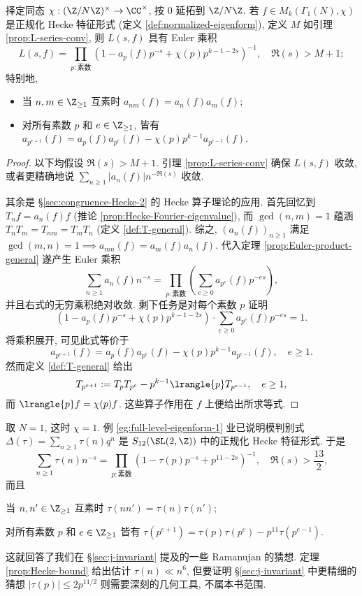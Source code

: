 \begin{theorem}[E.\ Hecke]\label{prop:Euler-prod-eigenform} 
	择定同态 $\chi: (\Z/N\Z)^\times \to \CC^\times$, 按 $0$ 延拓到 $\Z/N\Z$. 若 $f \in M_k(\Gamma_1(N), \chi)$ 是正规化 Hecke 特征形式 (定义 \ref{def:normalized-eigenform}), 定义 $M$ 如引理 \ref{prop:L-series-conv}, 则 $L(s,f)$ 具有 Euler 乘积
	\[ L(s,f) = \prod_{p: \text{素数}} \left( 1 - a_p(f) p^{-s} + \chi(p) p^{k-1-2s} \right)^{-1}, \quad \Re(s) > M+1; \]
	特别地,
	\begin{itemize}
		\item 当 $n, m \in \Z_{\geq 1}$ 互素时 $a_{nm}(f) = a_n(f) a_m(f)$;
		\item 对所有素数 $p$ 和 $e \in \Z_{\geq 1}$, 皆有 $a_{p^{e+1}}(f) = a_p(f) a_{p^e}(f) - \chi(p) p^{k-1} a_{p^{e-1}}(f)$.
	\end{itemize}
\end{theorem}
\begin{proof}
	以下均假设 $\Re(s) > M+1$. 引理 \ref{prop:L-series-conv} 确保 $L(s,f)$ 收敛, 或者更精确地说 $\sum_{n \geq 1} |a_n(f)| n^{-\Re(s)}$ 收敛.

	其余是 \S\ref{sec:congruence-Hecke-2} 的 Hecke 算子理论的应用. 首先回忆到 $T_n f = a_n(f) f$ (推论 \ref{prop:Hecke-Fourier-eigenvalue}), 而 $\gcd(n,m) = 1$ 蕴涵 $T_n T_m = T_{nm} = T_m T_n$ (定义 \ref{def:T-general}). 综之, $(a_n(f))_{n \geq 1}$ 满足 $\gcd(m,n) = 1 \implies a_{mn}(f) = a_m(f) a_n(f)$. 代入定理 \ref{prop:Euler-product-general} 遂产生 Euler 乘积
	\[ \sum_{n \geq 1} a_n(f) n^{-s} = \prod_{p: \text{素数}} \left( \sum_{e \geq 0} a_{p^e}(f) p^{-es} \right), \]
	并且右式的无穷乘积绝对收敛. 剩下任务是对每个素数 $p$ 证明
	\[ \left(  1 - a_p(f) p^{-s} + \chi(p) p^{k-1-2s} \right) \cdot \sum_{e \geq 0} a_{p^e}(f) p^{-es} = 1. \]
	将乘积展开, 可见此式等价于
	\[ a_{p^{e+1}}(f) = a_p(f) a_{p^e}(f) - \chi(p) p^{k-1} a_{p^{e-1}}(f), \quad e \geq 1. \]
	然而定义 \ref{def:T-general} 给出
	\[ T_{p^{e+1}} := T_p T_{p^e} - p^{k-1} \lrangle{p} T_{p^{e-1}}, \quad e \geq 1, \]
	而 $\lrangle{p} f = \chi(p) f$. 这些算子作用在 $f$ 上便给出所求等式.
\end{proof}

\begin{example}\label{eg:Ramanujan-coeff-mult}
	取 $N=1$, 这时 $\chi = 1$. 例 \ref{eg:full-level-eigenform-1} 业已说明模判别式 $\Delta(\tau) = \sum_{n \geq 1} \tau(n) q^n$ 是 $S_{12}(\SL(2,\Z))$ 中的正规化 Hecke 特征形式. 于是
	\[ \sum_{n \geq 1} \tau(n) n^{-s} = \prod_{p: \text{素数}} \left( 1 - \tau(p) p^{-s} + p^{11-2s} \right)^{-1}, \quad \Re(s) > \frac{13}{2}, \]
	而且
	\begin{compactitem}
		\item 当 $n,n' \in \Z_{\geq 1}$ 互素时 $\tau(nn') = \tau(n)\tau(n')$;
		\item 对所有素数 $p$ 和 $e \in \Z_{\geq 1}$ 皆有 $\tau(p^{e+1}) = \tau(p)\tau(p^e) - p^{11}\tau(p^{e-1})$.
	\end{compactitem}
	这就回答了我们在 \S\ref{sec:j-invariant} 提及的一些 Ramanujan 的猜想. 定理 \ref{prop:Hecke-bound} 给出估计 $\tau(n) \ll n^6$, 但要证明 \S\ref{sec:j-invariant} 中更精细的猜想 $|\tau(p)| \leq 2p^{11/2}$ 则需要深刻的几何工具, 不属本书范围.
\end{example}

